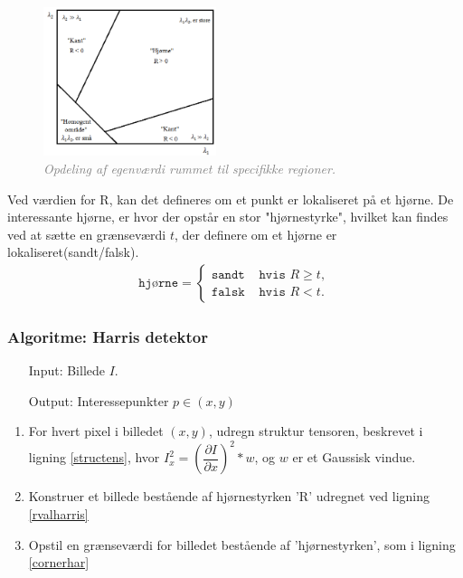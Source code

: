 \begin{enumerate}
{\begin{figure}[H]
    \centering
    \includegraphics[width=0.45\textwidth]{fig/26.png}
     \vspace{-1em}
    \begin{center}    
       \caption{\textcolor{gray}{\footnotesize \textit{ Opdeling af egenværdi rummet til specifikke regioner. }}}
    \label{fig:egen}
     \end{center}
     \vspace{-2.5em}
  \end{figure} \noindent
Ved værdien for R, kan det defineres om et punkt er lokaliseret på et hjørne. De interessante hjørne, er hvor der opstår en stor "hjørnestyrke", hvilket kan findes ved at sætte en grænseværdi $t$, der definere om et hjørne er lokaliseret(sandt/falsk).
\begin{equation}
\begin{split}
\texttt{hjørne} = 
\begin{cases}
\texttt{sandt}& \texttt{hvis } R\geq t, \\
\texttt{falsk }& \texttt{hvis } R < t.
\end{cases}
\end{split}
\label{cornerhar}
\end{equation}
}
\end{enumerate}
\subsubsection*{Algoritme: Harris detektor}
\begin{enumerate}
\item[Input:] Billede $I$.
\item[Output:] Interessepunkter $p \in (x,y)$
\end{enumerate}

\begin{enumerate}
\item{ For hvert pixel i billedet $(x,y)$, udregn struktur tensoren, beskrevet i ligning \eqref{structens}, hvor $ I_x^2 = (\dfrac{\partial I}{\partial x})^2 \ast w$, og $w$ er et Gaussisk vindue.}
\item{ Konstruer et billede bestående af hjørnestyrken 'R' udregnet ved ligning \eqref{rvalharris}}
\item{ Opstil en grænseværdi for billedet bestående af 'hjørnestyrken', som i ligning \eqref{cornerhar}}
\end{enumerate}
